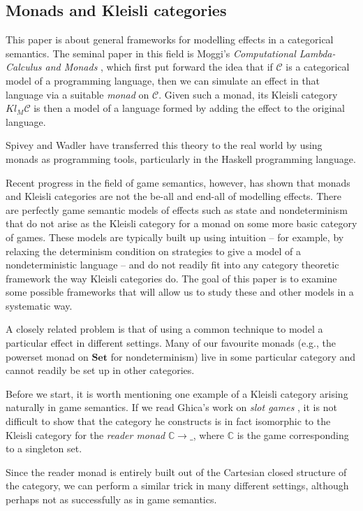\documentclass{svproc}
\newcommand\C{\mathcal{C}}
\newcommand{\catname}[1]{\mathbf{#1}}
\newcommand{\Set}{\catname{Set}}
\begin{document}
\subsection{Monads and Kleisli categories}

This paper is about general frameworks for modelling effects in a categorical semantics.  
The seminal paper in this field is Moggi's \emph{Computational Lambda-Calculus and Monads} \cite{Moggi}, which first put forward the idea that if $\C$ is a categorical model of a programming language, then we can simulate an effect in that language via a suitable \emph{monad} on $\C$.  
Given such a monad, its Kleisli category $Kl_M\C$ is then a model of a language formed by adding the effect to the original language.  

Spivey \cite{Spivey} and Wadler \cite{Wadler1,Wadler2} have transferred this theory to the real world by using monads as programming tools, particularly in the Haskell programming language.  

Recent progress in the field of game semantics, however, has shown that monads and Kleisli categories are not the be-all and end-all of modelling effects.  
There are perfectly game semantic models of effects such as state and nondeterminism that do not arise as the Kleisli category for a monad on some more basic category of games.  
These models are typically built up using intuition -- for example, by relaxing the determinism condition on strategies to give a model of a nondeterministic language -- and do not readily fit into any category theoretic framework the way Kleisli categories do.  
The goal of this paper is to examine some possible frameworks that will allow us to study these and other models in a systematic way.  

A closely related problem is that of using a common technique to model a particular effect in different settings.  
Many of our favourite monads (e.g., the powerset monad on $\Set$ for nondeterminism) live in some particular category and cannot readily be set up in other categories. 

Before we start, it is worth mentioning one example of a Kleisli category arising naturally in game semantics.  
If we read Ghica's work on \emph{slot games} \cite{SlotGames}, it is not difficult to show that the category he constructs is in fact isomorphic to the Kleisli category for the \emph{reader monad} $\mathbb{C}\to \_$, where $\mathbb{C}$ is the game corresponding to a singleton set.  

Since the reader monad is entirely built out of the Cartesian closed structure of the category, we can perform a similar trick in many different settings, although perhaps not as successfully as in game semantics.  
\end{document}
